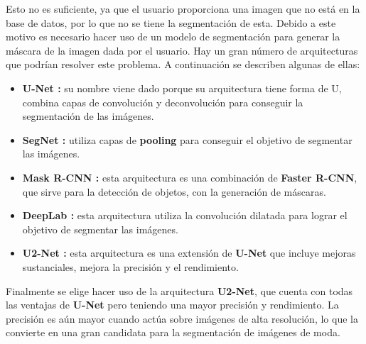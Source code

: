 \documentclass[12pt]{report} %
\begin{document}
	Esto no es suficiente, ya que el usuario proporciona una imagen que no está en la base de datos, por lo que no se tiene la segmentación de esta.
	Debido a este motivo es necesario hacer uso de un modelo de segmentación para generar la máscara de la imagen dada por el usuario.
	Hay un gran número de arquitecturas que podrían resolver este problema. A continuación se describen algunas de ellas:
	\begin{itemize}
		\item \textbf{U-Net \cite{unet}:} su nombre viene dado porque su arquitectura tiene forma de U, combina capas de convolución y deconvolución para conseguir la segmentación de las imágenes.
		\item \textbf{SegNet \cite{segNet}:} utiliza capas de \textbf{pooling} para conseguir el objetivo de segmentar las imágenes.
		\item \textbf{Mask R-CNN \cite{rcnn}:} esta arquitectura es una combinación de \textbf{Faster R-CNN}, que sirve para la detección de objetos, con la generación de máscaras.
		\item \textbf{DeepLab \cite{deeplab}:} esta arquitectura utiliza la convolución dilatada para lograr el objetivo de segmentar las imágenes.
		\item \textbf{U2-Net \cite{u2net}:} esta arquitectura es una extensión de \textbf{U-Net} que incluye mejoras sustanciales, mejora la precisión y el rendimiento.
	\end{itemize}


	Finalmente se elige hacer uso de la arquitectura \textbf{U2-Net}, que cuenta con todas las ventajas de \textbf{U-Net} pero teniendo una mayor precisión 
	y rendimiento. La precisión es aún mayor cuando actúa sobre imágenes de alta resolución,
	lo que la convierte en una gran candidata para la segmentación de imágenes de moda.
\end{document}
